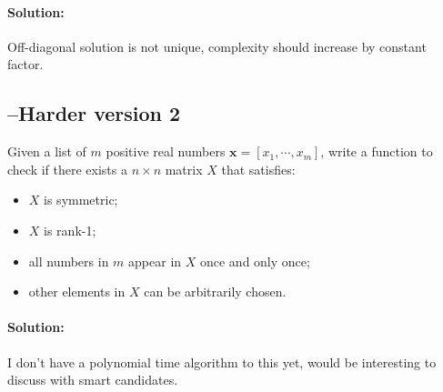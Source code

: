 \documentclass[11pt]{article}
\begin{document}
\paragraph{Solution:}
Off-diagonal solution is not unique, complexity should increase by constant factor.

\subsection*{--Harder version 2}
Given a list of $m$ positive real numbers $\bm{x}=[x_1,\cdots, x_m]$, write a function to check if there exists a $n\times n$ matrix $X$ that satisfies:
\begin{itemize}
\item $X$ is symmetric;
\item $X$ is rank-1;
\item all numbers in $m$ appear in $X$ once and only once;
\item other elements in $X$ can be arbitrarily chosen.
\end{itemize}
\paragraph{Solution:}
I don't have a polynomial time algorithm to this yet, would be interesting to discuss with smart candidates.
\end{document}
